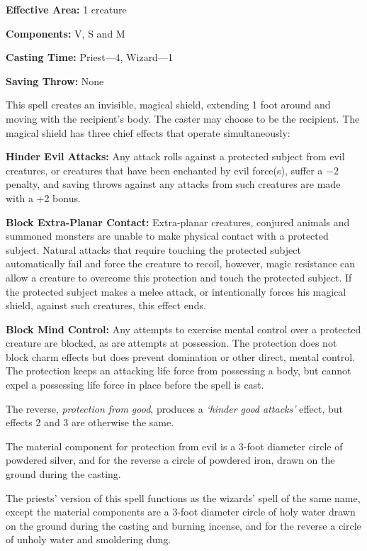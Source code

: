 \begin{multicols}{2}
\begin{minipage}{\columnwidth}
\noindent \textbf{Effective Area:} 1 creature

\noindent \textbf{Components:} V, S and M

\noindent \textbf{Casting Time:} Priest---4, Wizard---1

\noindent \textbf{Saving Throw:} None

\end{minipage}

This spell creates an invisible, magical shield, extending 1 foot around and moving with the recipient's body.  The caster may choose to be the recipient.  The magical shield has three chief effects that operate simultaneously:

\textbf{Hinder Evil Attacks:} Any attack rolls against a protected subject from evil creatures, or creatures that have been enchanted by evil force(s), suffer a $-2$ penalty, and saving throws against any attacks from such creatures are made with a +2 bonus.  

\textbf{Block Extra-Planar Contact:} Extra-planar creatures, conjured animals and summoned monsters are unable to make physical contact with a protected subject.  Natural attacks that require touching the protected subject automatically fail and force the creature to recoil, however, magic resistance can allow a creature to overcome this protection and touch the protected subject.  If the protected subject makes a melee attack, or intentionally forces his magical shield, against such creatures, this effect ends.  

\textbf{Block Mind Control:} Any attempts to exercise mental control over a protected creature are blocked, as are attempts at possession.  The protection does not block charm effects but does prevent domination or other direct, mental control.  The protection keeps an attacking life force from possessing a body, but cannot expel a possessing life force in place before the spell is cast.  

The reverse, \textit{protection from good}, produces a \textit{`hinder good attacks'} effect, but effects 2 and 3 are otherwise the same.  

The material component for protection from evil is a 3-foot diameter circle of powdered silver, and for the reverse a circle of powdered iron, drawn on the ground during the casting.

The priests' version of this spell functions as the wizards' spell of the same name, except the material components are a 3-foot diameter circle of holy water drawn on the ground during the casting and burning incense, and for the reverse a circle of unholy water and smoldering dung.


\end{multicols}
